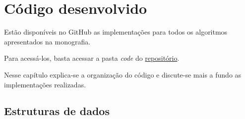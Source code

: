 \chapter{Código desenvolvido}

Estão disponíveis no GitHub as implementações para todos os algoritmos apresentados na monografia.

Para acessá-los, basta acessar a pasta \textit{code} do \href{github.com/gafeol/chinese-postman/}{repositório}.

Nesse capítulo explica-se a organização do código e discute-se mais a fundo as implementações realizadas.

\section{Estruturas de dados}

